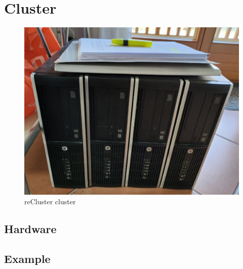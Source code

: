 \section{Cluster}
\label{sec:recluster_cluster}

\begin{figure}
  \centering
  \includegraphics[width=.5\textwidth]{images/recluster/cluster.png}
  \caption{reCluster cluster}
\end{figure}

\subsection{Hardware}
\label{subsec:recluster_cluster_hardware}

\subsection{Example}
\label{subsec:recluster_cluster_example}